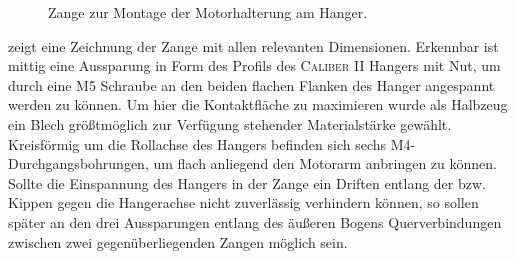 		\begin{figure}[h]
			\centering
			
			\caption[Zange zur Montage der Motorhalterung am Hanger]{Zange zur Montage der Motorhalterung am Hanger.}%
			\label{fig:hanger clamp drawing}
		\end{figure}
		 zeigt eine Zeichnung der Zange mit allen relevanten Dimensionen.
		Erkennbar ist mittig eine Aussparung in Form des Profils des \textsc{Caliber II} Hangers mit Nut, um durch eine M5 Schraube an den beiden flachen Flanken des Hanger angespannt werden zu können.
		Um hier die Kontaktfläche zu maximieren wurde als Halbzeug ein Blech größtmöglich zur Verfügung stehender Materialstärke gewählt.
		Kreisförmig um die Rollachse des Hangers befinden sich sechs M4-Durchgangsbohrungen, um flach anliegend den Motorarm anbringen zu können.
		Sollte die Einspannung des Hangers in der Zange ein Driften entlang der bzw. Kippen gegen die Hangerachse nicht zuverlässig verhindern können, so sollen später an den drei Aussparungen entlang des äußeren Bogens Querverbindungen zwischen zwei gegenüberliegenden Zangen möglich sein.


